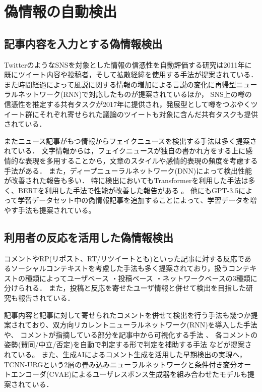 \section{偽情報の自動検出}
\subsection{記事内容を入力とする偽情報検出}
TwitterのようなSNSを対象とした情報の信憑性を自動評価する研究は2011年に既にツイート内容や投稿者，そして拡散経緯を使用する手法が提案されている\cite{10.1145/1963405.1963500}．
また時間経過によって風説に関する情報の増加による言説の変化に再帰型ニューラルネットワーク(RNN)で対応したものが提案されている\cite{10.5555/3061053.3061153}ほか，
SNS上の噂の信憑性を推定する共有タスクが2017年に提供され\cite{derczynski-etal-2017-semeval}，発展型として噂をつぶやくツイート群にそれぞれ寄せられた議論のツイートも対象に含んだ共有タスクも提供されている\cite{gorrell-etal-2019-semeval}．

またニュース記事がもつ情報からフェイクニュースを検出する手法は多く提案されている．
文字情報からは，フェイクニュースが独自の書かれ方をする上に感情的な表現を多用することから，文章のスタイル\cite{potthast-etal-2018-stylometric}や感情的表現の頻度\cite{DBLP:journals/corr/abs-1903-01728}を考慮する手法がある．
また，ディープニューラルネットワーク(DNN)によって検出性能が改善された報告\cite{wang-2017-liar,karimi-tang-2019-learning,karimi-etal-2018-multi}も多い．
特に検出においてもTransformerを利用した手法は多く、BERTを利用した手法で性能が改善した報告がある \cite{Kaliyar2021,yanagi2021classifying}。
他にもGPT-3.5によって学習データセット中の偽情報記事を追加することによって、学習データを増やす手法も提案されている\cite{lucas-etal-2023-fighting}。

\subsection{利用者の反応を活用した偽情報検出}
コメントやRP(リポスト、RT/リツイートとも)といった記事に対する反応であるソーシャルコンテキストを考慮した手法も多く提案されており，扱うコンテキストの種類によってユーザベース\cite{Castillo:2011:ICT:1963405.1963500,8397048,DBLP:journals/corr/abs-1904-13355}
・投稿ベース\cite{Yang_Shu_Wang_Gu_Wu_Liu_2019,Tacchini2017SomeLI,Jin:2016:NVE:3016100.3016318}
・ネットワークベース\cite{Wu:2018:TFF:3159652.3159677,DBLP:journals/corr/abs-1902-06673}の3種類に分けられる．
また，投稿と反応を寄せたユーザ情報と併せて検出を目指した研究も報告されている\cite{10.1145/3386253}．

記事内容と記事に対して寄せられたコメントを併せて検出を行う手法も幾つか提案されており、双方向リカレントニューラルネットワーク(RNN)を導入した手法や\cite{https://doi.org/10.1049/ise2.12021}、
コメントが指摘している部分を記事中から可視化する手法 \cite{10.1145/3292500.3330935}、
各コメントの姿勢(賛同/中立/否定)を自動で判定する形で判定を補助する手法 \cite{9414787} などが提案されている。
また、生成AIによるコメント生成を活用した早期検出の実現へ，TCNN-URGという2層の畳み込みニューラルネットワークと条件付き変分オートエンコーダ(CVAE)によるユーザレスポンス生成器を組み合わせたモデルも提案されている\cite{ijcai2018-533}．

